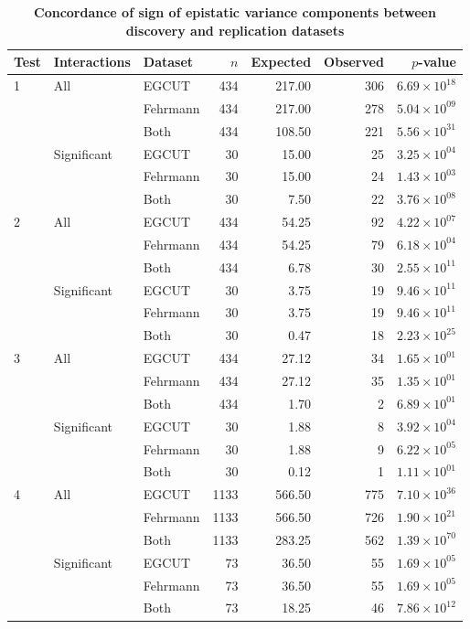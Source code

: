 \documentclass{article}
\begin{document}
\begin{table}[ht]
\begin{threeparttable}
\caption{\textbf{Concordance of sign of epistatic variance components between discovery and replication datasets}}
\label{tab:sign}
\begin{tabular}{lllrrrr}

  \hline
Test & Interactions & Dataset & $n$ & Expected & Observed & $p$-value \\
  \hline
1\tnote{a} & All & EGCUT & 434 & 217.00 & 306 & $6.69 \times 10^{18}$ \\
&  & Fehrmann & 434 & 217.00 & 278 & $5.04 \times 10^{09}$ \\
&  & Both & 434 & 108.50 & 221 & $5.56 \times 10^{31}$ \\
& Significant & EGCUT & 30 & 15.00 & 25 & $3.25 \times 10^{04}$ \\
&  & Fehrmann & 30 & 15.00 & 24 & $1.43 \times 10^{03}$ \\
&  & Both & 30 & 7.50 & 22 & $3.76 \times 10^{08}$ \\
  \hline
2\tnote{b} & All & EGCUT & 434 & 54.25 & 92 & $4.22 \times 10^{07}$ \\
&  & Fehrmann & 434 & 54.25 & 79 & $6.18 \times 10^{04}$ \\
&  & Both & 434 & 6.78 & 30 & $2.55 \times 10^{11}$ \\
& Significant & EGCUT & 30 & 3.75 & 19 & $9.46 \times 10^{11}$ \\
&  & Fehrmann & 30 & 3.75 & 19 & $9.46 \times 10^{11}$ \\
&  & Both & 30 & 0.47 & 18 & $2.23 \times 10^{25}$ \\
  \hline
3\tnote{c} & All & EGCUT & 434 & 27.12 & 34 & $1.65 \times 10^{01}$ \\
&  & Fehrmann & 434 & 27.12 & 35 & $1.35 \times 10^{01}$ \\
&  & Both & 434 & 1.70 &  2 & $6.89 \times 10^{01}$ \\
& Significant & EGCUT & 30 & 1.88 &  8 & $3.92 \times 10^{04}$ \\
&  & Fehrmann & 30 & 1.88 &  9 & $6.22 \times 10^{05}$ \\
&  & Both & 30 & 0.12 &  1 & $1.11 \times 10^{01}$ \\
  \hline
4\tnote{d} & All & EGCUT & 1133 & 566.50 & 775 & $7.10 \times 10^{36}$ \\
&  & Fehrmann & 1133 & 566.50 & 726 & $1.90 \times 10^{21}$ \\
&  & Both & 1133 & 283.25 & 562 & $1.39 \times 10^{70}$ \\
& Significant & EGCUT & 73 & 36.50 & 55 & $1.69 \times 10^{05}$ \\
&  & Fehrmann & 73 & 36.50 & 55 & $1.69 \times 10^{05}$ \\
&  & Both & 73 & 18.25 & 46 & $7.86 \times 10^{12}$ \\
   \hline
\end{tabular}


\end{threeparttable}
\end{table}
\end{document}
